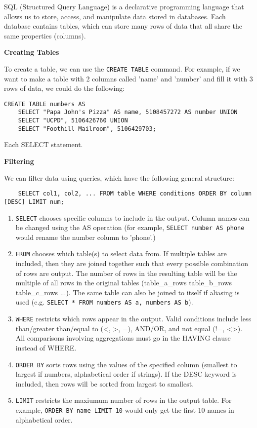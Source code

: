 SQL (Structured Query Language) is a declarative programming language that allows us to store, access, and manipulate data stored in databases.
Each database contains tables, which can store many rows of data that all share the same properties (columns). 


\textbf{Creating Tables}

To create a table, we can use the \texttt{CREATE TABLE} command. For example, if we want to make a table with 2 columns called 'name' and 'number' and fill it with 3 rows of data, we could do the following:
\newline

\begin{lstlisting}
CREATE TABLE numbers AS
    SELECT "Papa John's Pizza" AS name, 5108457272 AS number UNION
    SELECT "UCPD", 5106426760 UNION
    SELECT "Foothill Mailroom", 5106429703;
\end{lstlisting}

Each SELECT statement. 

\textbf{Filtering}

We can filter data using queries, which have the following general structure:
\begin{lstlisting}
    SELECT col1, col2, ... FROM table WHERE conditions ORDER BY column [DESC] LIMIT num;
\end{lstlisting}
\begin{enumerate}
    \item \texttt{SELECT} chooses specific columns to include in the output. Column names can be changed using the AS operation (for example, \texttt{SELECT number AS phone} would rename the number column to 'phone'.)
    \item \texttt{FROM} chooses which table(s) to select data from. If multiple tables are included, then they are joined together such that every possible combination of rows are output. The number of rows in the resulting table will be the multiple of all rows in the original tables (table\_a\_rows \* table\_b\_rows \* table\_c\_rows \* ...). The same table can also be joined to itself if aliasing is used (e.g. \texttt{SELECT * FROM numbers AS a, numbers AS b}).
    \item \texttt{WHERE} restricts which rows appear in the output. Valid conditions include less than/greater than/equal to (\textless, \textgreater, =), AND/OR, and not equal (!=, \textless\textgreater). All comparisons involving aggregations must go in the HAVING clause instead of WHERE.
    \item \texttt{ORDER BY} sorts rows using the values of the specified column (smallest to largest if numbers, alphabetical order if strings). If the DESC keyword is included, then rows will be sorted from largest to smallest.
    \item \texttt{LIMIT} restricts the maxiumum number of rows in the output table. For example, \texttt{ORDER BY name LIMIT 10} would only get the first 10 names in alphabetical order.
\end{enumerate}

